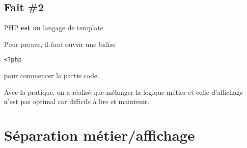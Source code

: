 \begin{otherlanguage}{english}
\begin{Shaded}
\begin{Highlighting}[]
    \NormalTok{ = }\OtherTok{(}\NormalTok{::}\OtherTok{);}
\StringTok{["}\StringTok{"] ?>"}
\NormalTok{        <} 
\NormalTok{        <} 
\NormalTok{>}
\NormalTok{<}
\OtherTok{:}
\NormalTok{<}
\end{Highlighting}
\end{Shaded}

\end{otherlanguage}

\hypertarget{fait-2}{%
\subsection{Fait \#2}\label{fait-2}}

PHP \textbf{est} un langage de template.

Pour preuve, il faut ouvrir une balise
\begin{otherlanguage}{english}\texttt{\textless{}?php}\end{otherlanguage}
pour commencer la partie code.

Avec la pratique, on a réalisé que mélanger la logique métier et celle
d'affichage n'est pas optimal car difficile à lire et maintenir.

\hypertarget{suxe9paration-muxe9tieraffichage}{%
\section{Séparation
métier/affichage}\label{suxe9paration-muxe9tieraffichage}}

